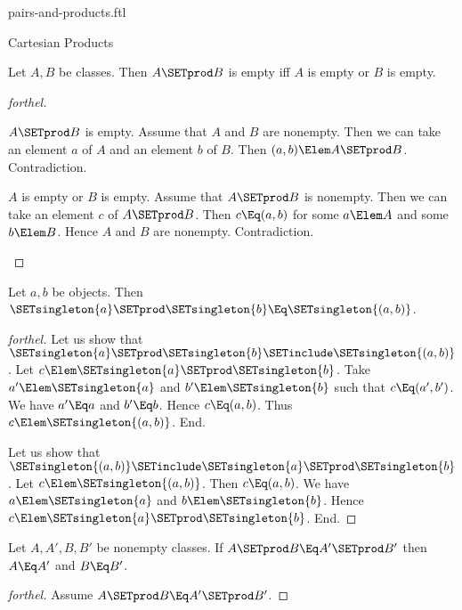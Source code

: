 \documentclass{stex}
\begin{document}
\begin{smodule}{pairs-and-products.ftl}
\begin{sfragment}{Cartesian Products}
  \begin{proposition}[forthel,id=FOUNDATIONS_04_2198552029691904]
    Let $A, B$ be classes.
    Then $A \SETprod B$ is empty iff $A$ is empty or $B$ is empty.
  \end{proposition}
  \begin{proof}[forthel]
    \begin{case}{$A \SETprod B$ is empty.}
      Assume that $A$ and $B$ are nonempty.
      Then we can take an element $a$ of $A$ and an element $b$ of $B$.
      Then $(a, b) \Elem A \SETprod B$.
      Contradiction.
    \end{case}

    \begin{case}{$A$ is empty or $B$ is empty.}
      Assume that $A \SETprod B$ is nonempty.
      Then we can take an element $c$ of $A \SETprod B$.
      Then $c \Eq (a, b)$ for some $a \Elem A$ and some $b \Elem B$.
      Hence $A$ and $B$ are nonempty.
      Contradiction.
    \end{case}
  \end{proof}

  \begin{proposition}[forthel,id=FOUNDATIONS_04_7971087096741888]
    Let $a, b$ be objects.
    Then $\SETsingleton{a} \SETprod \SETsingleton{b} \Eq \SETsingleton{(a, b)}$.
  \end{proposition}
  \begin{proof}[forthel]
    Let us show that $\SETsingleton{a} \SETprod \SETsingleton{b} \SETinclude \SETsingleton{(a, b)}$.
      Let $c \Elem \SETsingleton{a} \SETprod \SETsingleton{b}$.
      Take $a' \Elem \SETsingleton{a}$ and $b' \Elem \SETsingleton{b}$ such that $c \Eq (a', b')$.
      We have $a' \Eq a$ and $b' \Eq b$.
      Hence $c \Eq (a, b)$.
      Thus $c \Elem \SETsingleton{(a, b)}$.
    End.

    Let us show that $\SETsingleton{(a, b)} \SETinclude \SETsingleton{a} \SETprod \SETsingleton{b}$.
      Let $c \Elem \SETsingleton{(a, b)}$.
      Then $c \Eq (a, b)$.
      We have $a \Elem \SETsingleton{a}$ and $b \Elem \SETsingleton{b}$.
      Hence $c \Elem \SETsingleton{a} \SETprod \SETsingleton{b}$.
    End.
  \end{proof}

  \begin{proposition}[forthel,id=FOUNDATIONS_04_7456594440749056]
    Let $A, A', B, B'$ be nonempty classes.
    If $A \SETprod B \Eq A' \SETprod B'$ then $A \Eq A'$ and $B \Eq B'$.
  \end{proposition}
  \begin{proof}[forthel]
    Assume $A \SETprod B \Eq A' \SETprod B'$.


\end{proof}
\end{sfragment}
\end{smodule}
\end{document}
